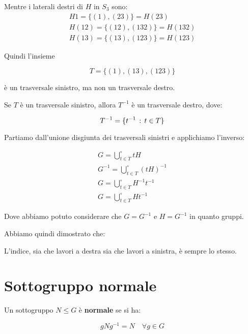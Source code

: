 Mentre i laterali destri di $H$ in $S_3$ sono:
\begin{gather*}
	H1 = \{(1), (23)\} = H(23) \\
	H(12) = \{(12), (132)\} = H(132) \\
	H(13) = \{(13), (123)\} = H(123)
\end{gather*}

Quindi l'insieme

\begin{equation}
	T = \{(1), (13), (123)\}
\end{equation}

è un trasversale sinistro, ma non un trasversale destro.

\begin{teorema}
	Se $T$ è un trasversale sinistro, allora $T^{-1}$ è un trasversale destro, dove:
	
	\begin{equation}
		T^{-1} = \{t^{-1} \,:\, t \in T\}
	\end{equation}
\end{teorema}
\begin{dimostrazione}
	Partiamo dall'unione disgiunta dei trasversali sinistri e applichiamo l'inverso:
	
	\begin{gather}
		G = \bigcup^\circ_{t \in T} tH \\
		G^{-1} = \bigcup^\circ_{t \in T} (tH)^{-1} \\
		G = \bigcup^\circ_{t \in T} H^{-1}t^{-1} \\
		G = \bigcup^\circ_{t \in T} Ht^{-1}
	\end{gather}

	Dove abbiamo potuto considerare che $G = G^{-1}$ e $H = G^{-1}$ in quanto gruppi.
\end{dimostrazione}

Abbiamo quindi dimostrato che:

\begin{teorema}
	L'indice, sia che lavori a destra sia che lavori a sinistra, è sempre lo stesso.
\end{teorema}

\section{Sottogruppo normale}

Un sottogruppo $N \le G$ è \textbf{normale} se si ha:

\begin{equation}
	gNg^{-1} = N \quad \forall g \in G
\end{equation}

